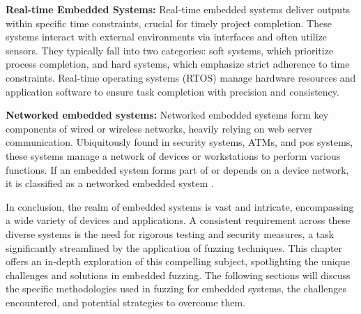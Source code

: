 \textbf{Real-time Embedded Systems:}
Real-time embedded systems deliver outputs within specific time constraints, crucial for timely
project completion. These systems interact with external environments via
interfaces and often utilize sensors. They typically fall into two categories:
soft systems, which prioritize process completion, and hard systems,
which emphasize strict adherence to time constraints.
Real-time operating systems (RTOS) manage hardware resources and application
software to ensure task completion with precision and consistency\cite{Introduc22:online}\cite{yun2022fuzzing}\cite{WhatAreE30:online}\cite{TypesofE31:online}.

\textbf{Networked embedded systems:}
Networked embedded systems form key components of wired or wireless networks,
heavily relying on web server communication. Ubiquitously found in security systems,
ATMs, and \acrlong{pos}\cite{WhatIsaP12:online} systems, these systems manage a network of devices or workstations
to perform various functions. If an embedded system forms part of or depends on a device network,
it is classified as a networked embedded system \cite{Introduc22:online}\cite{yun2022fuzzing}\cite{WhatAreE30:online}\cite{TypesofE31:online}.

In conclusion, the realm of embedded systems is vast and intricate,
encompassing a wide variety of devices and applications. A consistent
requirement across these diverse systems is the need for rigorous testing
and security measures, a task significantly streamlined by the application of
fuzzing techniques. This chapter offers an in-depth exploration of this
compelling subject, spotlighting the unique challenges and solutions in
embedded fuzzing\cite{eisele2022embedded}. The following sections will discuss
the specific methodologies used in fuzzing for embedded systems, the
challenges encountered, and potential strategies to overcome them.



